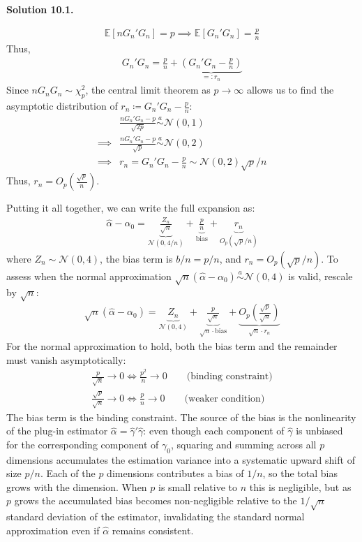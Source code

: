 \documentclass[11pt]{article}
\newenvironment{solution}[1]
    {\bigskip\noindent\textbf{Solution #1.} \par}
    {\medskip}
\newcommand{\ev}{\mathbb{E}}
\begin{document}
\begin{solution}{10.1}
\begin{align*}
    \ev[nG_n'G_n ] = p \implies \ev[G_n'G_n ] = \frac{p}{n}
\end{align*}
Thus, 
\begin{align*}
    G_n'G_n = \frac{p}{n} + \underbrace{\left(G_n'G_n - \frac{p}{n}\right)}_{=:r_n}
\end{align*}
Since $nG_nG_n \sim \chi^2_p$, the central limit theorem as $p \to \infty$ allows us to find the asymptotic distribution of $r_n \coloneq G_n'G_n - \frac{p}{n}:$
\begin{align*}
    &\frac{nG_n'G_n - p}{\sqrt{2p}} \overset{a}{\sim} \mathcal{N}(0,1) \\
    \implies&\frac{nG_n'G_n - p}{\sqrt{p}} \overset{a}{\sim} \mathcal{N}(0,2) \\
    \implies&r_n = G_n'G_n - \frac{p}{n} \sim\mathcal{N}(0,2)\sqrt{p}/n
\end{align*}
Thus, $r_n = O_p(\frac{\sqrt{p}}{n}).$

Putting it all together, we can write the full expansion as:
\begin{align*}
    \hat{\alpha} - \alpha_0 = \underbrace{\frac{Z_n}{\sqrt{n}}}_{\mathcal{N}(0,4/n)} + \underbrace{\frac{p}{n}}_{\text{bias}} + \underbrace{r_n}_{O_p(\sqrt{p}/n)}
\end{align*}
where $Z_n \sim \mathcal{N}(0,4)$, the bias term is $b/n = p/n$, and $r_n = O_p(\sqrt{p}/n)$. To assess when the normal approximation $\sqrt{n}(\hat{\alpha} - \alpha_0) \overset{a}{\sim} \mathcal{N}(0,4)$ is valid, rescale by $\sqrt{n}$:
\begin{align*}
    \sqrt{n}(\hat{\alpha} - \alpha_0) = \underbrace{Z_n}_{\mathcal{N}(0,4)} + \underbrace{\frac{p}{\sqrt{n}}}_{\sqrt{n} \cdot \text{bias}} + \underbrace{O_p\!\left(\frac{\sqrt{p}}{\sqrt{n}}\right)}_{\sqrt{n}\cdot r_n}
\end{align*}
For the normal approximation to hold, both the bias term and the remainder must vanish asymptotically:
\begin{align*}
    \frac{p}{\sqrt{n}} \to 0 \iff \frac{p^2}{n} \to 0 \qquad \text{(binding constraint)}\\
    \frac{\sqrt{p}}{\sqrt{n}} \to 0 \iff \frac{p}{n} \to 0 \qquad \text{(weaker condition)}
\end{align*}
The bias term is the binding constraint. The source of the bias is the nonlinearity of the plug-in estimator $\hat{\alpha} = \hat{\gamma}'\hat{\gamma}$: even though each component of $\hat{\gamma}$ is unbiased for the corresponding component of $\gamma_0$, squaring and summing across all $p$ dimensions accumulates the estimation variance into a systematic upward shift of size $p/n$. Each of the $p$ dimensions contributes a bias of $1/n$, so the total bias grows with the dimension. When $p$ is small relative to $n$ this is negligible, but as $p$ grows the accumulated bias becomes non-negligible relative to the $1/\sqrt{n}$ standard deviation of the estimator, invalidating the standard normal approximation even if $\hat{\alpha}$ remains consistent.
\end{solution}
\end{document}
